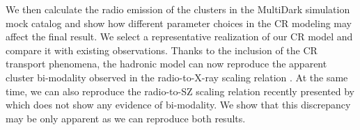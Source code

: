 \documentclass[traditabstract]{aa}
\newcommand{\rmn}{\mathrm}
\begin{document}
We then calculate the radio emission of the clusters in the MultiDark simulation mock catalog and show how different parameter choices in the CR modeling may affect the final result. We select a representative realization of our CR model and compare it with existing observations.
Thanks to the inclusion of the CR transport phenomena, the hadronic model can now reproduce the apparent cluster bi-modality observed in the radio-to-X-ray scaling relation \citep{2009A&A...507..661B,2011A&A...527A..99E}. At the same time, we can also reproduce the radio-to-SZ scaling relation recently presented by \cite{2012MNRAS.421L.112B} which does not show any evidence of bi-modality. We show that this discrepancy may be only apparent as we can reproduce both results.
\end{document}

